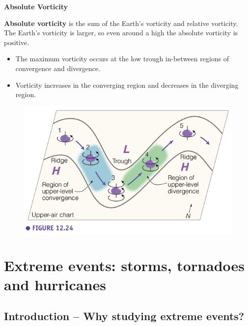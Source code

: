 \documentclass[12pt,oneside]{book}
\providecommand{\tightlist}{%
  \setlength{\itemsep}{0pt}\setlength{\parskip}{0pt}}
\begin{document}
\textbf{Absolute Vorticity}

\textbf{Absolute vorticity} is the sum of the Earth's vorticity and
relative vorticity. The Earth's vorticity is larger, so even around a
high the absolute vorticity is positive.

\begin{itemize}
\tightlist
\item
  The maximum vorticity occurs at the low trough in-between regions of
  convergence and divergence.
\item
  Vorticity increases in the converging region and decreases in the
  diverging region.
\end{itemize}

\begin{figure}

{\centering \includegraphics[width=0.8\linewidth]{figures/Figure634d} 

}

\caption{ }\label{fig:Fig634d}
\end{figure}

\chapter{Extreme events: storms, tornadoes and
hurricanes}\label{introEE}


\section{Introduction -- Why studying extreme
events?}\label{introduction-why-studying-extreme-events}
\end{document}
